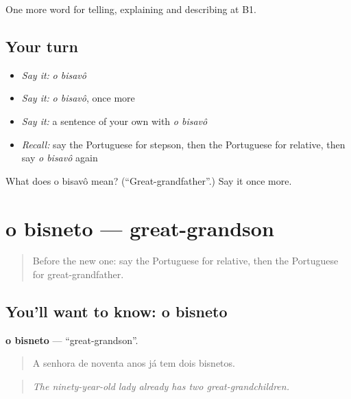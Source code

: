 \begin{grammarlens}[title={What you've built}]
One more word for telling, explaining and describing at B1.
\end{grammarlens}

\subsection*{Your turn}
\begin{itemize}
\raggedright
  \item \emph{Say it:} \emph{o bisavô}
  \item \emph{Say it:} \emph{o bisavô}, once more
  \item \emph{Say it:} a sentence of your own with \emph{o bisavô}
  \item \emph{Recall:} say the Portuguese for stepson, then the Portuguese for relative, then say \emph{o bisavô} again
\end{itemize}

\begin{tcolorbox}[breakable,colback=teal!4,colframe=teal!35!black,title={Before you move on}]
What does o bisavô mean? (\textquotedblleft{}Great-grandfather\textquotedblright{}.) Say it once more.
\end{tcolorbox}
\section[o bisneto]{o bisneto — great-grandson}

\label{lesson:PT-C493-bisneto}



\begin{quote}
Before the new one: say the Portuguese for relative, then the Portuguese for great-grandfather.
\end{quote}

\subsection*{You'll want to know: o bisneto}
\textbf{o bisneto} — \textquotedblleft{}great-grandson\textquotedblright{}.

\begin{quote}
A senhora de noventa anos já tem dois bisnetos.
\end{quote}

\begin{quote}
\emph{The ninety-year-old lady already has two great-grandchildren.}
\end{quote}

